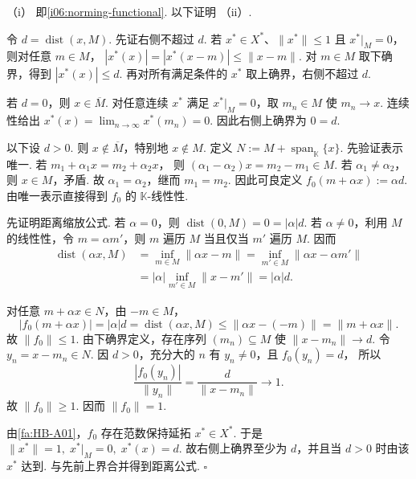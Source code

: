 \begin{FAProof}
（i） 即\autoref{i06:norming-functional}. 以下证明 （ii）.

令 \(\displaystyle d=\operatorname{dist}(x,M)\). 先证右侧不超过 \(\displaystyle d\). 若 \(\displaystyle x^*\in X^*\)、\(\displaystyle \|x^*\|\leqslant1\) 且 \(\displaystyle x^*|_M=0\)，则对任意 \(\displaystyle m\in M\)， \(\displaystyle |x^*(x)| =|x^*(x-m)| \leqslant\|x-m\|\).
对 \(\displaystyle m\in M\) 取下确界，得到 \(\displaystyle |x^*(x)|\leqslant d\). 再对所有满足条件的 \(\displaystyle x^*\) 取上确界，右侧不超过 \(\displaystyle d\).

若 \(\displaystyle d=0\)，则 \(\displaystyle x\in\overline M\). 对任意连续 \(\displaystyle x^*\) 满足 \(\displaystyle x^*|_M=0\)，取 \(\displaystyle m_n\in M\) 使 \(\displaystyle m_n\to x\). 连续性给出 \(\displaystyle x^*(x)=\lim_{n\to\infty}x^*(m_n)=0\).
因此右侧上确界为 \(\displaystyle0=d\).

以下设 \(\displaystyle d>0\). 则 \(\displaystyle x\notin\overline M\)，特别地 \(\displaystyle x\notin M\). 定义 \(\displaystyle N:=M+\operatorname{span}_{\mathbb K}\{x\}\).
先验证表示唯一. 若 \(\displaystyle m_1+\alpha_1x=m_2+\alpha_2x\)，
则 \(\displaystyle (\alpha_1-\alpha_2)x=m_2-m_1\in M\).
若 \(\displaystyle \alpha_1\neq\alpha_2\)，则 \(\displaystyle x\in M\)，矛盾. 故 \(\displaystyle \alpha_1=\alpha_2\)，继而 \(\displaystyle m_1=m_2\). 因此可良定义 \(\displaystyle f_0(m+\alpha x):=\alpha d\).
由唯一表示直接得到 \(\displaystyle f_0\) 的 \(\displaystyle \mathbb K\)-线性性.

先证明距离缩放公式. 若 \(\displaystyle \alpha=0\)，则 \(\displaystyle \operatorname{dist}(0,M)=0=|\alpha|d\). 若 \(\displaystyle \alpha\neq0\)，利用 \(\displaystyle M\) 的线性性，令 \(\displaystyle m=\alpha m'\)，则 \(\displaystyle m\) 遍历 \(\displaystyle M\) 当且仅当 \(\displaystyle m'\) 遍历 \(\displaystyle M\). 因而
\[
\begin{aligned}
\operatorname{dist}(\alpha x,M)
&=\inf_{m\in M}\|\alpha x-m\|=\inf_{m'\in M}\|\alpha x-\alpha m'\|\\
&=|\alpha|\inf_{m'\in M}\|x-m'\|=|\alpha|d.
\end{aligned}
\]

对任意 \(\displaystyle m+\alpha x\in N\)，由 \(\displaystyle -m\in M\)，
\[
|f_0(m+\alpha x)|=|\alpha|d=\operatorname{dist}(\alpha x,M)\leqslant\|\alpha x-(-m)\|=\|m+\alpha x\|.
\]
故 \(\displaystyle \|f_0\|\leqslant1\). 由下确界定义，存在序列 \(\displaystyle (m_n)\subseteq M\) 使 \(\displaystyle \|x-m_n\|\longrightarrow d\).
令 \(\displaystyle y_n=x-m_n\in N\). 因 \(\displaystyle d>0\)，充分大的 \(\displaystyle n\) 有 \(\displaystyle y_n\neq0\)，且 \(\displaystyle f_0(y_n)=d\)，
所以
\[
\frac{|f_0(y_n)|}{\|y_n\|}
=
\frac{d}{\|x-m_n\|}
\longrightarrow1.
\]
故 \(\displaystyle \|f_0\|\geqslant1\). 因而 \(\displaystyle \|f_0\|=1\).

由\autoref{fa:HB-A01}，\(\displaystyle f_0\) 存在范数保持延拓 \(\displaystyle x^*\in X^*\). 于是 \(\displaystyle \|x^*\|=1, \; x^*|_M=0, \; x^*(x)=d\).
故右侧上确界至少为 \(\displaystyle d\)，并且当 \(\displaystyle d>0\) 时由该 \(\displaystyle x^*\) 达到. 与先前上界合并得到距离公式.
\hfill\(\square\)
\end{FAProof}

